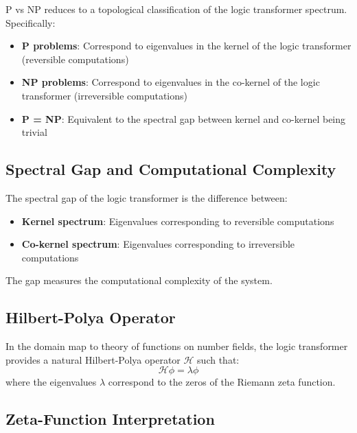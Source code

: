 \begin{theorem}
\label{thm:p-vs-np-spectrum}
P vs NP reduces to a topological classification of the logic transformer spectrum. Specifically:
\begin{itemize}
\item \textbf{P problems}: Correspond to eigenvalues in the kernel of the logic transformer (reversible computations)
\item \textbf{NP problems}: Correspond to eigenvalues in the co-kernel of the logic transformer (irreversible computations)
\item \textbf{P = NP}: Equivalent to the spectral gap between kernel and co-kernel being trivial
\end{itemize}
\end{theorem}

\subsection{Spectral Gap and Computational Complexity}

\begin{definition}
\label{def:spectral-gap}
The spectral gap of the logic transformer is the difference between:
\begin{itemize}
\item \textbf{Kernel spectrum}: Eigenvalues corresponding to reversible computations
\item \textbf{Co-kernel spectrum}: Eigenvalues corresponding to irreversible computations
\end{itemize}

The gap measures the computational complexity of the system.
\end{definition}

\subsection{Hilbert-Polya Operator}

\begin{definition}
\label{def:hilbert-polya}
In the domain map to theory of functions on number fields, the logic transformer provides a natural Hilbert-Polya operator $\mathcal{H}$ such that:
\[
\mathcal{H} \phi = \lambda \phi
\]
where the eigenvalues $\lambda$ correspond to the zeros of the Riemann zeta function.
\end{definition}

\subsection{Zeta-Function Interpretation}

